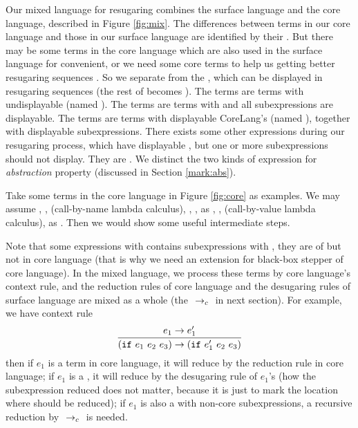 Our mixed language for resugaring combines the surface language and the core language, described in Figure \ref{fig:mix}.
%
The differences between terms in our core language and those in our surface language are identified by their . But there may be some terms in the core language which are also used in the surface language for convenient, or we need some core terms to help us getting better resugaring sequences . So we separate  from the , which can be displayed in resugaring sequences (the rest of  becomes ). The  terms are terms with undisplayable  (named ). The  terms are terms with  and all subexpressions are displayable. The  terms are terms with displayable CoreLang's  (named ), together with displayable subexpressions. There exists some other expressions during our resugaring process, which have displayable , but one or more subexpressions should not display. They are . We distinct the two kinds of expression for \emph{abstraction} property (discussed in Section \ref{mark:abs}).

Take some terms in the core language in Figure \ref{fig:core} as examples.
We may assume , ,  (call-by-name lambda calculus), , ,  as , ,  (call-by-value lambda calculus),  as . Then we would show some useful intermediate steps.

Note that some expressions with  contains subexpressions with , they are of  but not in core language (that is why we need an extension for black-box stepper of core language). In the mixed language, we process these terms by core language's context rule, and the reduction rules of core language and the desugaring rules of surface language are mixed as a whole (the $~\rightarrow_c~$ in next section). For example, we have context rule
\[
\infer{(\m{if}~e_1~e_2~e_3) \rightarrow (\m{if}~e_1'~e_2~e_3)}{e_1 \rightarrow e_1'}
\]
then if $e_1$ is a term in core language, it will reduce by the reduction rule in core language; if $e_1$ is a , it will reduce by the desugaring rule of $e_1$'s  (how the subexpression reduced does not matter, because it is just to mark the location where should be reduced); if $e_1$ is also a  with non-core subexpressions, a recursive reduction by $~\rightarrow_c~$ is needed.


